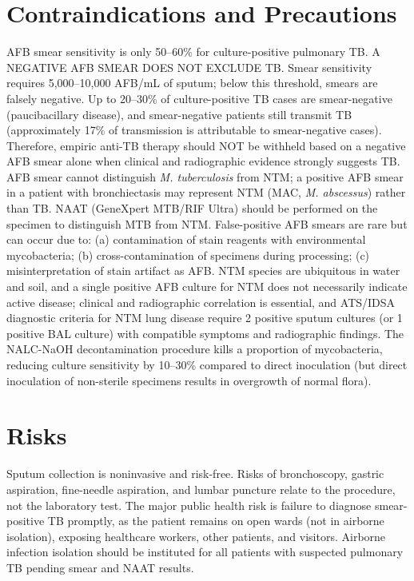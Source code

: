 \section*{Contraindications and Precautions}
AFB smear sensitivity is only 50--60\% for culture-positive pulmonary TB. A NEGATIVE AFB SMEAR DOES NOT EXCLUDE TB. Smear sensitivity requires 5,000--10,000 AFB/mL of sputum; below this threshold, smears are falsely negative. Up to 20--30\% of culture-positive TB cases are smear-negative (paucibacillary disease), and smear-negative patients still transmit TB (approximately 17\% of transmission is attributable to smear-negative cases). Therefore, empiric anti-TB therapy should NOT be withheld based on a negative AFB smear alone when clinical and radiographic evidence strongly suggests TB. AFB smear cannot distinguish \textit{M. tuberculosis} from NTM; a positive AFB smear in a patient with bronchiectasis may represent NTM (MAC, \textit{M. abscessus}) rather than TB. NAAT (GeneXpert MTB/RIF Ultra) should be performed on the specimen to distinguish MTB from NTM. False-positive AFB smears are rare but can occur due to: (a) contamination of stain reagents with environmental mycobacteria; (b) cross-contamination of specimens during processing; (c) misinterpretation of stain artifact as AFB. NTM species are ubiquitous in water and soil, and a single positive AFB culture for NTM does not necessarily indicate active disease; clinical and radiographic correlation is essential, and ATS/IDSA diagnostic criteria for NTM lung disease require 2 positive sputum cultures (or 1 positive BAL culture) with compatible symptoms and radiographic findings. The NALC-NaOH decontamination procedure kills a proportion of mycobacteria, reducing culture sensitivity by 10--30\% compared to direct inoculation (but direct inoculation of non-sterile specimens results in overgrowth of normal flora).

\section*{Risks}
Sputum collection is noninvasive and risk-free. Risks of bronchoscopy, gastric aspiration, fine-needle aspiration, and lumbar puncture relate to the procedure, not the laboratory test. The major public health risk is failure to diagnose smear-positive TB promptly, as the patient remains on open wards (not in airborne isolation), exposing healthcare workers, other patients, and visitors. Airborne infection isolation should be instituted for all patients with suspected pulmonary TB pending smear and NAAT results.

